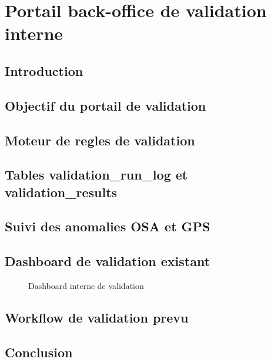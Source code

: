 \chapter{Portail back-office de validation interne}

\section{Introduction}

\section{Objectif du portail de validation}

\section{Moteur de regles de validation}

\section{Tables validation\_run\_log et validation\_results}

\section{Suivi des anomalies OSA et GPS}

\section{Dashboard de validation existant}
\begin{figure}[htbp]
    \centering
    \caption{Dashboard interne de validation}
    \label{fig:dashboard_validation}
\end{figure}

\section{Workflow de validation prevu}

\section{Conclusion}

